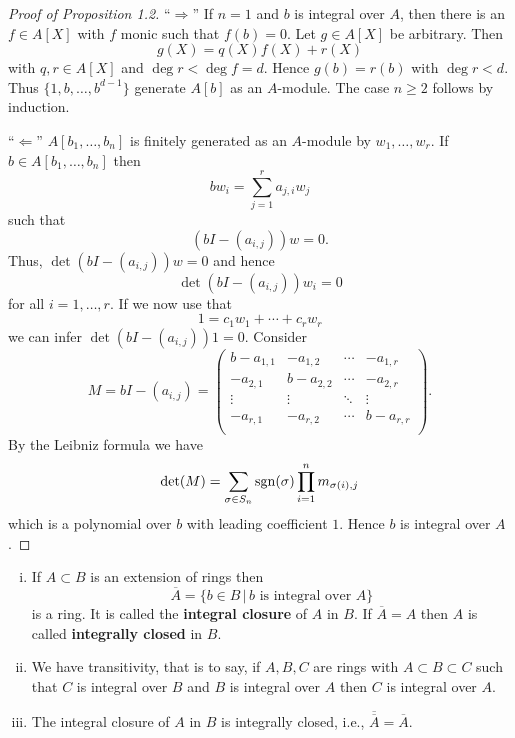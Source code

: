 \begin{proof}[Proof of Proposition 1.2]
\enquote{$\Rightarrow$} If $n=1$ and $b$ is integral over $A$, then there is an $f \in A[X]$ with $f$ monic such that $f(b)=0$. Let $g \in A[X]$ be arbitrary. Then 
\[ g(X) = q(X)f(X)+r(X)
\]
with $q,r \in A[X]$ and $\deg r < \deg f = d$. Hence $g(b)=r(b)$ with $\deg r < d$. Thus $\{1,b, \dots, b^{d-1} \}$ generate $A[b]$ as an $A$-module.
The case $n\geq 2$ follows by induction.

\bigskip \enquote{$\Leftarrow$}
$A[b_1,\dots,b_n]$ is finitely generated as an $A$-module by $w_1, \dots, w_r$.
If $b \in A[b_1,\dots,b_n]$ then
\[ bw_i = \sum_{j=1}^{r} a_{j,i}w_j
\]
such that
\[ \left( bI - (a_{i,j}) \right)w = 0.
\]
Thus, $\det \left( bI - (a_{i,j}) \right)w = 0$ and hence 
\[\det \left( bI - (a_{i,j}) \right)w_i = 0
\]
for all $i=1,\dots, r$. If we now use that 
\[ 1 = c_1w_1+ \cdots + c_rw_r
\]
we can infer $\det \left( bI - (a_{i,j}) \right)1 = 0$. Consider
\[M= bI - (a_{i,j}) = \begin{pmatrix}
b-a_{1,1} & -a_{1,2} & \cdots & -a_{1,r} \\
-a_{2,1} & b-a_{2,2} & \cdots & -a_{2,r} \\
\vdots & \vdots & \ddots & \vdots \\
-a_{r,1} & -a_{r,2} & \cdots & b-a_{r,r} \\
\end{pmatrix}.
\]
By the Leibniz formula we have
\[ \det(M)= \sum_{\sigma\in S_n} \operatorname{sgn}(\sigma ) \prod_{i=1}^n m_{\sigma(i),j}
\]
which is a polynomial over $b$ with leading coefficient $1$. Hence $b$ is integral over $A$.
\end{proof}


\begin{cor}
\begin{enumerate}[(i)]
	\item If $A \subset B$ is an extension of rings then
	\[ \overline{A} = \{ b \in B \, | \, b \text{ is integral over } A
	\}
	\]
	is a ring. It is called the \textbf{integral closure } of $A$ in $B$.
	If $\overline{A} = A$ then $A$ is called \textbf{integrally closed}  in $B$.
	\item We have transitivity, that is to say, if $A,B,C$ are rings with $A \subset B \subset C$ such that $C$ is integral over $B$ and $B$ is integral over $A$ then $C$ is integral over $A$.
	\item The integral closure of $A$ in $B$ is integrally closed, i.e., 
	$\overline{\overline{A}} = \overline{A}$.
\end{enumerate}
\end{cor}


